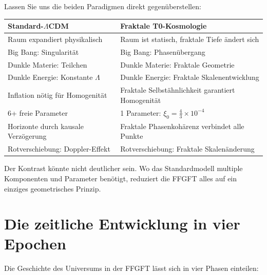 Lassen Sie uns die beiden Paradigmen direkt gegenüberstellen:

\begin{center}
\small
\begin{tabular}{p{}|p{}}
\toprule
\textbf{Standard-$\Lambda$CDM} & \textbf{Fraktale T0-Kosmologie} \\
\midrule
Raum expandiert physikalisch & Raum ist statisch, fraktale Tiefe ändert sich \\
Big Bang: Singularität & Big Bang: Phasenübergang \\
Dunkle Materie: Teilchen & Dunkle Materie: Fraktale Geometrie \\
Dunkle Energie: Konstante $\Lambda$ & Dunkle Energie: Fraktale Skalenentwicklung \\
Inflation nötig für Homogenität & Fraktale Selbstähnlichkeit garantiert Homogenität \\
6+ freie Parameter & 1 Parameter: $\xi_0 = \frac{4}{3} \times 10^{-4}$ \\
Horizonte durch kausale Verzögerung & Fraktale Phasenkohärenz verbindet alle Punkte \\
Rotverschiebung: Doppler-Effekt & Rotverschiebung: Fraktale Skalenänderung \\
\bottomrule
\end{tabular}
\end{center}

Der Kontrast könnte nicht deutlicher sein. Wo das Standardmodell multiple Komponenten und Parameter benötigt, reduziert die FFGFT alles auf ein einziges geometrisches Prinzip.

\section{Die zeitliche Entwicklung in vier Epochen}

Die Geschichte des Universums in der FFGFT lässt sich in vier Phasen einteilen:

